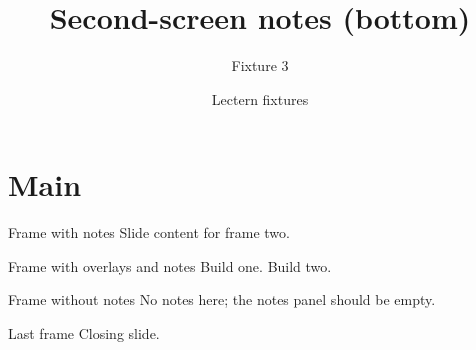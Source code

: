 \documentclass[aspectratio=43]{beamer}
\title{Second-screen notes (bottom)}
\subtitle{Fixture 3}
\author{Lectern fixtures}
\date{}
\begin{document}
\begin{frame}
  \titlepage
\end{frame}
\section{Main}
\begin{frame}{Frame with notes}
  Slide content for frame two.
\end{frame}
\begin{frame}{Frame with overlays and notes}
  Build one.
  \pause
  Build two.
\end{frame}
\begin{frame}{Frame without notes}
  No notes here; the notes panel should be empty.
\end{frame}
\begin{frame}{Last frame}
  Closing slide.
\end{frame}
\end{document}
